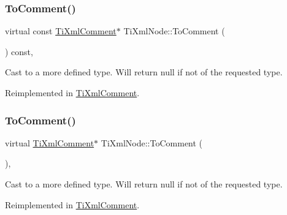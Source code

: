 \subsubsection{\texorpdfstring{To\+Comment()}{ToComment()}\hspace{0.1cm}{\footnotesize\ttfamily [1/2]}}
{\footnotesize\ttfamily virtual const \hyperlink{class_ti_xml_comment}{Ti\+Xml\+Comment}$\ast$ Ti\+Xml\+Node\+::\+To\+Comment (\begin{DoxyParamCaption}{ }\end{DoxyParamCaption}) const\hspace{0.3cm}{\ttfamily [inline]}, {\ttfamily [virtual]}}



Cast to a more defined type. Will return null if not of the requested type. 



Reimplemented in \hyperlink{class_ti_xml_comment_a1032e176d3eb73017ceabc698cac0f16}{Ti\+Xml\+Comment}.

\mbox{\label{class_ti_xml_node_a383e06a0787f7063953934867990f849}} 
\subsubsection{\texorpdfstring{To\+Comment()}{ToComment()}\hspace{0.1cm}{\footnotesize\ttfamily [2/2]}}
{\footnotesize\ttfamily virtual \hyperlink{class_ti_xml_comment}{Ti\+Xml\+Comment}$\ast$ Ti\+Xml\+Node\+::\+To\+Comment (\begin{DoxyParamCaption}{ }\end{DoxyParamCaption})\hspace{0.3cm}{\ttfamily [inline]}, {\ttfamily [virtual]}}



Cast to a more defined type. Will return null if not of the requested type. 



Reimplemented in \hyperlink{class_ti_xml_comment_acc7c7e07e13c23f17797d642981511df}{Ti\+Xml\+Comment}.

\mbox{\label{class_ti_xml_node_a0dc0831e89d499ca911a3be61a413d45}} 
